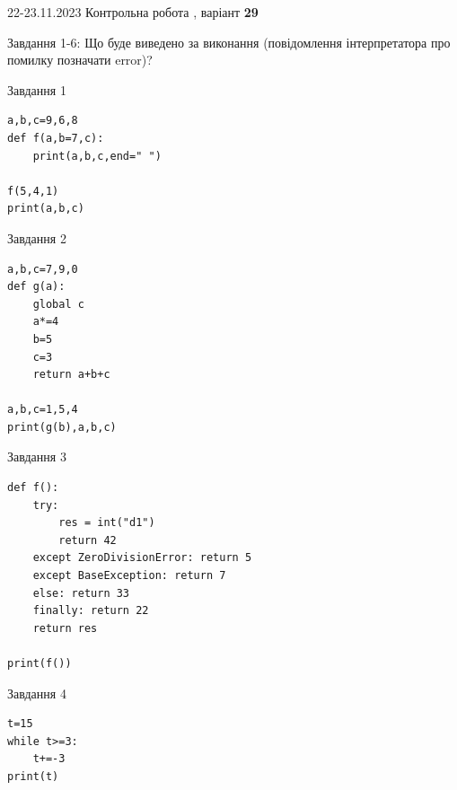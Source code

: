 \documentclass[12pt, ukrainian]{article}
\begin{document}
{{22-23.11.2023 Контрольна робота , варіант  \No \textbf { 29 }\par}}
{

Завдання 1-6: Що буде виведено за виконання (повідомлення інтерпретатора про помилку позначати error)?


\begin{minipage}[t]{9.7cm}                
{\begin{center}Завдання {1}\end{center}}
\begin{verbatim}
a,b,c=9,6,8
def f(a,b=7,c):
    print(a,b,c,end=" ")

f(5,4,1)
print(a,b,c)
\end{verbatim}     
\end{minipage}
\vline \hspace{8mm}
\begin{minipage}[t]{8.0cm}                
{\begin{center}Завдання {2}\end{center}}
\begin{verbatim}
a,b,c=7,9,0
def g(a):
    global c
    a*=4
    b=5
    c=3
    return a+b+c

a,b,c=1,5,4
print(g(b),a,b,c)
\end{verbatim}     
\end{minipage}

\vspace{15mm}
\begin{minipage}[t]{9.7cm}                
{\begin{center}Завдання {3}\end{center}}
\begin{verbatim}
def f():
    try:
        res = int("d1")
        return 42
    except ZeroDivisionError: return 5
    except BaseException: return 7
    else: return 33
    finally: return 22
    return res

print(f())
\end{verbatim}     
\end{minipage}
\vline \hspace{8mm}
\begin{minipage}[t]{8.0cm}                
{\begin{center}Завдання {4}\end{center}}
\begin{verbatim}
t=15
while t>=3:
    t+=-3
print(t)
\end{verbatim}     
\end{minipage}

}
\end{document}
